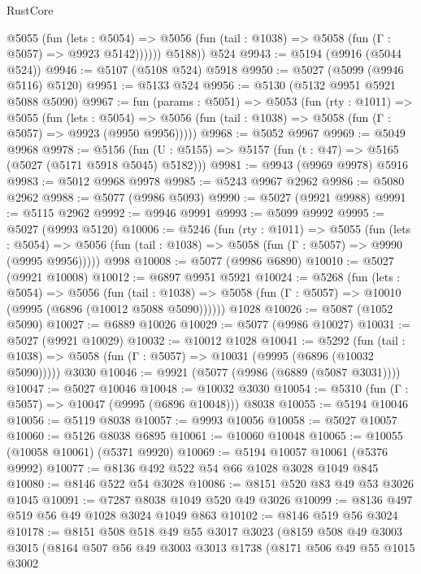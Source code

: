 \begin{lexlean}{RustCore}
\begin{coremodule}
            @5055
              (fun (lets : @5054) =>
              @5056 (fun (tail : @1038) => @5058 (fun (Γ : @5057) => @9923 @5142))))))
        @5188))
    @524
@9943 := @5194 (@9916 (@5044 @524))
@9946 := @5107 (@5108 @524) @5918
@9950 := @5027 (@5099 (@9946 @5116) @5120)
@9951 := @5133 @524
@9956 := @5130 (@5132 @9951 @5921 @5088 @5090)
@9967 := fun (params : @5051) =>
  @5053
    (fun (rty : @1011) =>
    @5055
      (fun (lets : @5054) =>
      @5056 (fun (tail : @1038) => @5058 (fun (Γ : @5057) => @9923 (@9950 @9956)))))
@9968 := @5052 @9967
@9969 := @5049 @9968
@9978 := @5156 (fun (U : @5155) => @5157 (fun (t : @47) => @5165 (@5027 (@5171 @5918 @5045) @5182)))
@9981 := @9943 (@9969 @9978) @5916
@9983 := @5012 @9968 @9978
@9985 := @5243 @9967 @2962
@9986 := @5080 @2962
@9988 := @5077 (@9986 @5093)
@9990 := @5027 (@9921 @9988)
@9991 := @5115 @2962
@9992 := @9946 @9991
@9993 := @5099 @9992
@9995 := @5027 (@9993 @5120)
@10006 := @5246
    (fun (rty : @1011) =>
    @5055
      (fun (lets : @5054) =>
      @5056 (fun (tail : @1038) => @5058 (fun (Γ : @5057) => @9990 (@9995 @9956)))))
    @998
@10008 := @5077 (@9986 @6890)
@10010 := @5027 (@9921 @10008)
@10012 := @6897 @9951 @5921
@10024 := @5268
    (fun (lets : @5054) =>
    @5056
      (fun (tail : @1038) =>
      @5058 (fun (Γ : @5057) => @10010 (@9995 (@6896 (@10012 @5088 @5090))))))
    @1028
@10026 := @5087 (@1052 @5090)
@10027 := @6889 @10026
@10029 := @5077 (@9986 @10027)
@10031 := @5027 (@9921 @10029)
@10032 := @10012 @1028
@10041 := @5292
    (fun (tail : @1038) => @5058 (fun (Γ : @5057) => @10031 (@9995 (@6896 (@10032 @5090)))))
    @3030
@10046 := @9921 (@5077 (@9986 (@6889 (@5087 @3031))))
@10047 := @5027 @10046
@10048 := @10032 @3030
@10054 := @5310 (fun (Γ : @5057) => @10047 (@9995 (@6896 @10048))) @8038
@10055 := @5194 @10046
@10056 := @5119 @8038
@10057 := @9993 @10056
@10058 := @5027 @10057
@10060 := @5126 @8038 @6895
@10061 := @10060 @10048
@10065 := @10055 (@10058 @10061) (@5371 @9920)
@10069 := @5194 @10057 @10061 (@5376 @9992)
@10077 := @8136 @492 @522 @54 @66 @1028 @3028 @1049 @845
@10080 := @8146 @522 @54 @3028
@10086 := @8151 @520 @83 @49 @53 @3026 @1045
@10091 := @7287 @8038 @1049 @520 @49 @3026
@10099 := @8136 @497 @519 @56 @49 @1028 @3024 @1049 @863
@10102 := @8146 @519 @56 @3024
@10178 := @8151
    @508
    @518
    @49
    @55
    @3017
    @3023
    (@8159
      @508
      @49
      @3003
      @3015
      (@8164
        @507
        @56
        @49
        @3003
        @3013
        @1738
        (@8171
          @506
          @49
          @55
          @1015
          @3002

\end{coremodule}
\end{lexlean}
